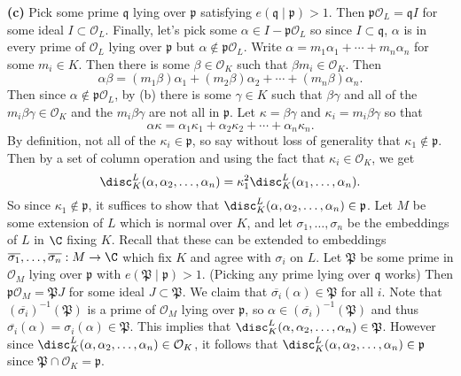 \documentclass[11pt,letterpaper]{article}
\begin{document}
\begin{solution}
    \textbf{(c)} Pick some prime $\mathfrak{q}$ lying over $\mathfrak{p}$ satisfying $e(\mathfrak{q}\mid\mathfrak{p})>1$. Then $\mathfrak{p}\mathcal{O}_L=\mathfrak{q}I$ for some ideal $I\subset \mathcal{O}_L$. Finally, let's pick some $\alpha\in I-\mathfrak{p}\mathcal{O}_L$ so since $I\subset \mathfrak{q}$, $\alpha$ is in every prime of $\mathcal{O}_L$ lying over $\mathfrak{p}$ but $\alpha\not\in \mathfrak{p}\mathcal{O}_L$. Write $\alpha=m_1\alpha_1+\cdots+m_n\alpha_n$ for some $m_i\in K$. Then there is some $\beta\in \mathcal{O}_K$ such that $\beta m_i\in \mathcal{O}_K$. Then 
    \[
        \alpha\beta= (m_1\beta)\alpha_1+(m_2\beta)\alpha_2+\cdots+(m_n\beta)\alpha_n
    .\] 
    Then since $\alpha\not\in \mathfrak{p}\mathcal{O}_L$, by (b) there is some $\gamma\in K$ such that $\beta\gamma$ and all of the $m_i\beta\gamma\in \mathcal{O}_K$ and the $m_i\beta\gamma$ are not all in $\mathfrak{p}$. Let $\kappa=\beta\gamma$ and $\kappa_i=m_i\beta\gamma$ so that
    \[
        \alpha\kappa = \alpha_1\kappa_1+\alpha_2\kappa_2+\cdots+\alpha_n\kappa_n
    .\]    
    By definition, not all of the $\kappa_i\in \mathfrak{p}$, so say without loss of generality that $\kappa_1\not\in \mathfrak{p}$. Then by a set of column operation and using the fact that $\kappa_i\in \mathcal{O}_K$, we get 
    \[
        \disc^L_K(\alpha,\alpha_2,\ldots,\alpha_n) = \kappa_1^2\disc^L_K(\alpha_1,\ldots,\alpha_n)
    .\] 
    So since $\kappa_1\not\in \mathfrak{p}$, it suffices to show that $\disc^L_K(\alpha, \alpha_2,\ldots,\alpha_n)\in \mathfrak{p}$.  Let $M$ be some extension of $L$ which is normal over $K$, and let $\sigma_1,\ldots,\sigma_n$ be the embeddings of $L$ in $\C$ fixing $K$. Recall that these can be extended to embeddings $\overline{\sigma_1},\ldots,\overline{\sigma_n} : M \to \C$ which fix $K$ and agree with $\sigma_i$ on $L$. Let $\mathfrak{P}$ be some prime in $\mathcal{O}_M$ lying over $\mathfrak{p}$ with $e(\mathfrak{P}\mid \mathfrak{p})>1$. (Picking any prime lying over $\mathfrak{q}$ works) Then $\mathfrak{p}\mathcal{O}_M=\mathfrak{P}J$ for some ideal $J\subset \mathfrak{P}$. We claim that $\overline{\sigma_i}(\alpha)\in \mathfrak{P}$ for all $i$. Note that $(\overline{\sigma_i})^{-1}(\mathfrak{P})$ is a prime of $\mathcal{O}_M$ lying over $\mathfrak{p}$, so $\alpha\in (\overline{\sigma_i})^{-1}(\mathfrak{P})$ and thus $\overline{\sigma_i}(\alpha)=\sigma_i(\alpha)\in \mathfrak{P}$. This implies that $\disc^L_K(\alpha,\alpha_2,\ldots,\alpha_n)\in \mathfrak{P}$. However since $\disc^L_K(\alpha,\alpha_2,\ldots,\alpha_n)\in \mathcal{O}_K$, it follows that $\disc^L_K(\alpha,\alpha_2,\ldots,\alpha_n)\in \mathfrak{p}$ since $\mathfrak{P}\cap \mathcal{O}_K = \mathfrak{p}$. 
\end{solution}
\end{document}
